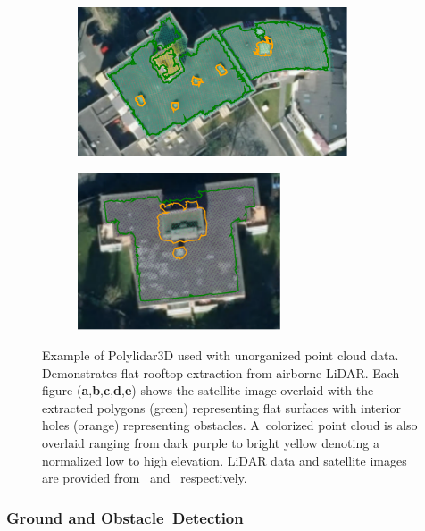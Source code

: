 \begin{figure}[ht]
\begin{subfigure}[t]{.55\linewidth}
    \centering\includegraphics[trim=0mm 0mm 0mm 0mm, clip, width=8cm]{chapter_3_polylidar3d/imgs/rooftop/74310126_satellite.pdf}
    \caption{\label{fig:ch3_rooftop_d}}
  \end{subfigure}
  \hfill
  \begin{subfigure}[t]{.40\linewidth}
    \centering\includegraphics[trim=0mm 4mm 0mm 0mm, clip, width=6cm]{chapter_3_polylidar3d/imgs/rooftop/74201616_satellite.pdf}
    \caption{\label{fig:ch3_rooftop_e}}
  \end{subfigure}
  \caption[Example of Polylidar3D used with unorganized point cloud data]{Example of Polylidar3D used with unorganized point cloud data. Demonstrates flat rooftop extraction from airborne LiDAR. Each figure (\textbf{a},\textbf{b},\textbf{c},\textbf{d},\textbf{e}) shows the satellite image overlaid with the extracted polygons (green) representing flat surfaces with interior holes (orange) representing obstacles. A~colorized point cloud is also overlaid ranging from dark purple to bright yellow denoting a normalized low to high elevation. LiDAR data and satellite images are provided from~\cite{lidar_germany} and~\cite{satellite_germany} respectively. }\label{fig:ch3_rooftop}
\end{figure}
\unskip





\subsubsection{Ground and Obstacle~Detection}\label{sec:ch3_results_kitti}


